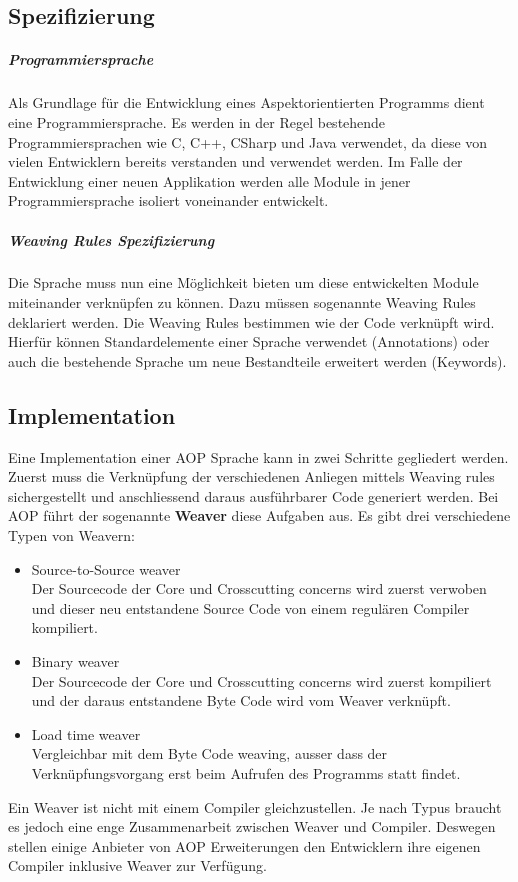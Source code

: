 \subsection{Spezifizierung}
\subparagraph{Programmiersprache}
Als Grundlage für die Entwicklung eines Aspektorientierten Programms dient eine Programmiersprache. Es werden in der Regel bestehende Programmiersprachen wie C, C++, CSharp und Java verwendet, da diese von vielen Entwicklern bereits verstanden und verwendet werden. Im Falle der Entwicklung einer neuen Applikation werden alle Module in jener Programmiersprache isoliert voneinander entwickelt.
\subparagraph{Weaving Rules Spezifizierung}
Die Sprache muss nun eine Möglichkeit bieten um diese entwickelten Module miteinander verknüpfen zu können. Dazu müssen sogenannte Weaving Rules deklariert werden. Die Weaving Rules bestimmen wie der Code verknüpft wird. Hierfür können Standardelemente einer Sprache verwendet (Annotations) oder auch die bestehende Sprache um neue Bestandteile erweitert werden (Keywords).
\subsection{Implementation}
Eine Implementation einer AOP Sprache kann in zwei Schritte gegliedert werden. Zuerst muss die Verknüpfung der verschiedenen Anliegen mittels Weaving rules sichergestellt und anschliessend daraus  ausführbarer Code generiert werden. Bei AOP führt der sogenannte \textbf{Weaver} diese Aufgaben aus. Es gibt drei verschiedene Typen von Weavern:

\begin{itemize}
\item Source-to-Source weaver \\ Der Sourcecode der Core und Crosscutting concerns wird zuerst verwoben und dieser neu entstandene Source Code von einem regulären Compiler kompiliert. 
\item Binary weaver \\ Der Sourcecode der Core und Crosscutting concerns wird zuerst kompiliert und der daraus entstandene Byte Code wird vom Weaver verknüpft.
\item Load time weaver \\ Vergleichbar mit dem Byte Code weaving, ausser dass der Verknüpfungsvorgang erst beim Aufrufen des Programms statt findet.
\end{itemize}

Ein Weaver ist nicht mit einem Compiler gleichzustellen. Je nach Typus braucht es jedoch eine enge Zusammenarbeit zwischen Weaver und Compiler. Deswegen stellen einige Anbieter von AOP Erweiterungen den Entwicklern ihre eigenen Compiler inklusive Weaver zur Verfügung.\newpage

